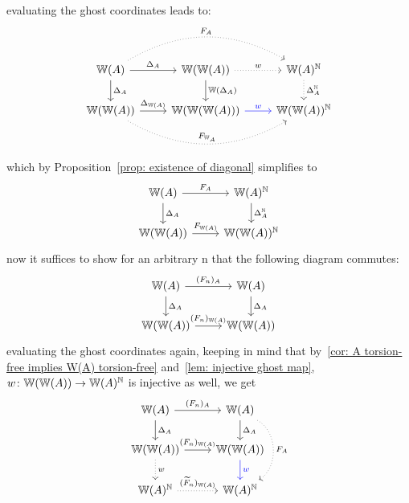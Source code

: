 \begin{bigproof}
\begin{claim*}
    \end{claim*}
    \begin{smallproof}
        evaluating the ghost coordinates leads to:
        \[
            \begin{tikzcd}
                \W(A) \arrow[r,"\Delta_A",] \arrow[d,"\Delta_A"] \arrow[rr,bend left,"F_A",dotted]
                 & \W(\W(A)) \arrow[d,"\W(\Delta_A)"] \arrow[r,"w",dotted] 
                 & \W(A)^{\N} \arrow[d,"\Delta_A^{\N}",dotted]\\
                \W(\W(A)) \arrow[r,"\Delta_{\W(A)}"] \arrow[rr,bend right,"F_{\W_A}",dotted]
                  & \W(\W(\W(A))) \arrow[r,"w",blue]
                  & \W(\W(A))^{\N}
            \end{tikzcd}  
        \]
        which by Proposition~\ref{prop: existence of diagonal} simplifies to
        \[
            \begin{tikzcd}
                \W(A) \arrow[r,"F_A"] \arrow[d,"\Delta_A"] 
                 & \W(A)^{\N} \arrow[d,"\Delta_A^{\N}"] \\
                \W(\W(A)) \arrow[r,"F_{\W(A)}"]
                  & \W(\W(A))^{\N}
            \end{tikzcd}
        \]
        now it suffices to show for an arbitrary n that the following diagram commutes:
        \[
            \begin{tikzcd}
                \W(A) \arrow[r,"(F_n)_A"] \arrow[d,"\Delta_A"] 
                 & \W(A) \arrow[d,"\Delta_A"] \\
                \W(\W(A)) \arrow[r,"(F_n)_{\W(A)}"]
                  & \W(\W(A))
            \end{tikzcd}
        \]
        evaluating the ghost coordinates again, keeping in mind that 
        by~\ref{cor: A torsion-free implies W(A) torsion-free}
        and~\ref{lem: injective ghost map}, 
        $w \colon \mathbb{W}(\mathbb{W}(A)) \to \mathbb{W}(A)^{\mathbb{N}}$ is injective as well, we get
        \[
            \begin{tikzcd}
                \W(A) \arrow[r,"(F_n)_A"] \arrow[d,"\Delta_A"] 
                 & \W(A) \arrow[d,"\Delta_A"] \arrow[dd,bend left = 60,"F_A",dotted]\\
                \W(\W(A)) \arrow[r,"(F_n)_{\W(A)}"] \arrow[d,"w",dotted]
                  & \W(\W(A)) \arrow[d,"w",blue] \\
                \W(A)^{\N} \arrow[r,"(\widetilde{F}_n)_{\W(A)}",dotted]
                & \W(A)^{\N}
            \end{tikzcd}
        \]

\end{smallproof}
\end{bigproof}
